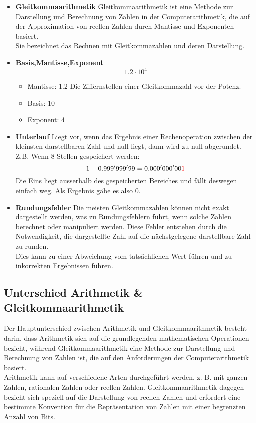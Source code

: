 \documentclass [final]{article}
\theoremstyle{definition}
\begin{document}
\begin{itemize}
	\item {\bfseries Gleitkommaarithmetik} \linebreak
	Gleitkommaarithmetik ist eine Methode zur Darstellung und Berechnung von Zahlen in der Computerarithmetik, die auf der Approximation von reellen Zahlen durch Mantisse und Exponenten basiert. \\
	Sie bezeichnet das Rechnen mit Gleitkommazahlen und deren Darstellung.
	\item {\bfseries Basis,Mantisse,Exponent} \linebreak
	\begin{displaymath}
		1.2 \cdot 10^4
	\end{displaymath}
		\begin{itemize}
			\item Mantisse: 1.2 \newline
			Die Ziffernstellen einer Gleitkommazahl vor der Potenz.
			\item Basis: 10
			\item Exponent: 4
		\end{itemize}
	\item {\bfseries Unterlauf} \linebreak
	Liegt vor, wenn das Ergebnis einer Rechenoperation zwischen der kleinsten darstellbaren Zahl und null liegt, dann wird zu null abgerundet. \\
	Z.B. Wenn 8 Stellen gespeichert werden:
	\begin{displaymath}
		1-0.999'999'99 = 0.000'000'00 {\color{red} 1}
	\end{displaymath}
	Die Eins liegt ausserhalb des gespeicherten Bereiches und fällt deswegen einfach weg. Als Ergebnis gäbe es also  0.
		
	\item {\bfseries Rundungsfehler} \linebreak
	Die meisten Gleitkommazahlen können nicht exakt dargestellt werden, was zu Rundungsfehlern führt, wenn solche Zahlen berechnet oder manipuliert werden. Diese Fehler entstehen durch die Notwendigkeit, die dargestellte Zahl auf die nächstgelegene darstellbare Zahl zu runden. \\
	Dies kann zu einer Abweichung vom tatsächlichen Wert führen und zu inkorrekten Ergebnissen führen.

\end{itemize}

\subsection{Unterschied Arithmetik \& Gleitkommaarithmetik}
Der Hauptunterschied zwischen Arithmetik und Gleitkommaarithmetik besteht darin, dass Arithmetik sich auf die grundlegenden mathematischen Operationen bezieht, während Gleitkommaarithmetik eine Methode zur Darstellung und Berechnung von Zahlen ist, die auf den Anforderungen der Computerarithmetik basiert.  \\
Arithmetik kann auf verschiedene Arten durchgeführt werden, z. B. mit ganzen Zahlen, rationalen Zahlen oder reellen Zahlen. Gleitkommaarithmetik dagegen bezieht sich speziell auf die Darstellung von reellen Zahlen und erfordert eine bestimmte Konvention für die Repräsentation von Zahlen mit einer begrenzten Anzahl von Bits.
\end{document}
